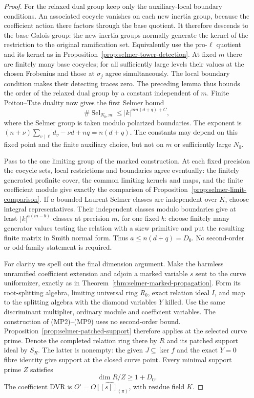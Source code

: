 \begin{proof}
For the relaxed dual group keep only the auxiliary-local
boundary conditions. An associated cocycle vanishes on each new
inertia group, because the coefficient action there factors
through the base quotient. It therefore descends to the base
Galois group: the new inertia groups normally generate the
kernel of the restriction to the original ramification set.
Equivalently use the pro-$\ell$ quotient and its kernel as in
Proposition~\ref{prop:selmer-tower-detection}. At fixed $m$
there are finitely many base cocycles; for all sufficiently
large levels their values at the chosen Frobenius and those
at $\sigma_j$ agree simultaneously. The local boundary
condition makes their detecting traces zero. The preceding
lemma thus bounds the order of the relaxed dual group by a
constant independent of $m$. Finite Poitou--Tate duality now
gives the first Selmer bound
\[
 \#\operatorname{Sel}_{N_0,m}
        \le |k|^{mn(d+q)+C},
\]
where the Selmer group is taken modulo polarized boundaries.
The exponent is
$(n+\nu)\sum_{v\mid\ell}d_v-\nu d+nq=n(d+q)$.
The constants may depend on this fixed point and the finite
auxiliary choice, but not on $m$ or sufficiently large $N_0$.

Pass to the one limiting group of the marked construction.
At each fixed precision the cocycle sets, local restrictions
and boundaries agree eventually: the finitely generated
profinite cover, the common limiting kernels and maps, and
the finite coefficient module give exactly the comparison
of Proposition~\ref{prop:selmer-limit-comparison}.
If $a$ bounded Laurent Selmer classes are independent over
$K$, choose integral representatives. Their independent
classes modulo boundaries give at least $|k|^{a(m-b)}$
classes at precision $m$, for one fixed $b$: choose finitely
many generator values testing the relation with a skew
primitive and put the resulting finite matrix in Smith
normal form. Thus $a\le n(d+q)=D_0$.
No second-order or odd-family statement is required.

For clarity we spell out the final dimension argument. Make
the harmless unramified coefficient extension and adjoin a
marked variable $s$ sent to the curve uniformizer, exactly
as in Theorem~\ref{thm:selmer-marked-propagation}. Form its
root-splitting algebra, limiting universal ring $R_0$, exact
relation ideal $I$, and map to the splitting algebra with
the diamond variables $Y$ killed. Use the same
discriminant multiplier, ordinary module and coefficient
variables. The construction of (MP2)--(MP9) uses no
second-order bound. Proposition~\ref{prop:selmer-patched-support}
therefore applies at the selected curve prime. Denote the
completed relation ring there by $R$ and its patched support
ideal by $S_R$. The latter is nonempty: the given
$J\subseteq\ker f$ and the exact $Y=0$ fibre identity give
support at the closed curve point. Every minimal support
prime $Z$ satisfies
\[
                     \dim R/Z\ge1+D_0 .
\]
The coefficient DVR is
$O'=\widehat{O[[s]]_{(\pi)}}$, with residue field $K$.


\end{proof}
